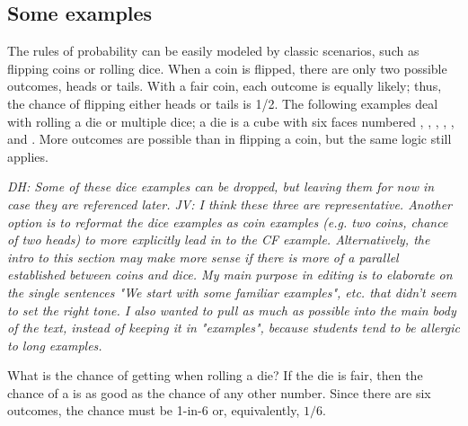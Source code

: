 \begin{doublespace}
\subsection{Some examples}

The rules of probability can be easily modeled by classic scenarios, such as flipping coins or rolling dice. When a coin is flipped, there are only two possible outcomes, heads or tails. With a fair coin, each outcome is equally likely; thus, the chance of flipping either heads or tails is 1/2. The following examples deal with rolling a die or multiple dice; a die is a cube with six faces numbered , , , , , and . More outcomes are possible than in flipping a coin, but the same logic still applies.

\textit{DH: Some of these dice examples can be dropped, but leaving them for now in case they are referenced later. JV: I think these three are representative. Another option is to reformat the dice examples as coin examples (e.g. two coins, chance of two heads) to more explicitly lead in to the CF example. Alternatively, the intro to this section may make more sense if there is more of a parallel established between coins and dice. My main purpose in editing is to elaborate on the single sentences "We start with some familiar examples", etc. that didn't seem to set the right tone. I also wanted to pull as much as possible into the main body of the text, instead of keeping it in "examples", because students tend to be allergic to long examples.}

\begin{example}{What is the chance of getting  when rolling a die?}\label{probOf1}
If the die is fair, then the chance of a  is as good as the chance of any other number. Since there are six outcomes, the chance must be 1-in-6 or, equivalently, $1/6$.
\end{example}

\end{doublespace}
